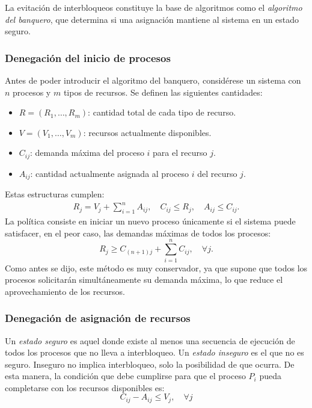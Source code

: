 La evitación de interbloqueos constituye la base de algoritmos como el \textit{algoritmo del banquero}, que determina si una asignación mantiene al sistema en un estado seguro.

\subsubsection{Denegación del inicio de procesos}

Antes de poder introducir el algoritmo del banquero, considérese un sistema con \(n\) procesos y \(m\) tipos de recursos. Se definen las siguientes cantidades:
\begin{itemize}
  \item \(R=(R_1,\dots,R_m)\): cantidad total de cada tipo de recurso.
  \item \(V=(V_1,\dots,V_m)\): recursos actualmente disponibles.
  \item \(C_{ij}\): demanda máxima del proceso \(i\) para el recurso \(j\).
  \item \(A_{ij}\): cantidad actualmente asignada al proceso \(i\) del recurso \(j\).
\end{itemize}

Estas estructuras cumplen:
\begin{gather*}
R_j = V_j + \sum_{i=1}^{n} A_{ij},\quad
C_{ij} \le R_j,
\quad
A_{ij} \le C_{ij}.
\end{gather*}
La política consiste en iniciar un nuevo proceso únicamente si el sistema puede satisfacer, en el peor caso, las demandas máximas de todos los procesos:
\[
R_j \ge C_{(n+1)j} + \sum_{i=1}^{n} C_{ij},
\quad \forall j.
\]
Como antes se dijo, este método es muy conservador, ya que supone que todos los procesos solicitarán simultáneamente su demanda máxima, lo que reduce el aprovechamiento de los recursos.

\subsubsection{Denegación de asignación de recursos}

Un \textit{estado seguro} es aquel donde existe al menos una secuencia de ejecución de todos los procesos que no lleva a interbloqueo. Un \textit{estado inseguro} es el que no es seguro. Inseguro no implica interbloqueo, solo la posibilidad de que ocurra. De esta manera, la condición que debe cumplirse para que el proceso \(P_i\) pueda completarse con los recursos disponibles es:
\begin{equation}
C_{ij} - A_{ij} \leq V_j, \quad \forall j
\end{equation}

